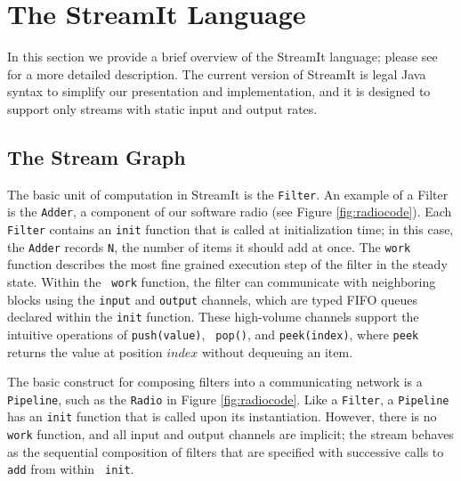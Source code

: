 \documentclass{sig-alternate}
\begin{document}
\section{The StreamIt Language}

In this section we provide a brief overview of the StreamIt language;
please see \cite{streamittech} for a more detailed description.  The
current version of StreamIt is legal Java syntax to simplify our
presentation and implementation, and it is designed to support only
streams with static input and output rates.

\subsection{The Stream Graph}

The basic unit of computation in StreamIt is the {\tt Filter}.  An
example of a Filter is the {\tt Adder}, a component of our software
radio (see Figure \ref{fig:radiocode}).  Each {\tt Filter} contains an
{\tt init} function that is called at initialization time; in this
case, the {\tt Adder} records {\tt N}, the number of items it should
add at once.  The {\tt work} function describes the most fine grained
execution step of the filter in the steady state.  Within the {\tt
work} function, the filter can communicate with neighboring blocks
using the {\tt input} and {\tt output} channels, which are typed FIFO
queues declared within the {\tt init} function.  These high-volume
channels support the intuitive operations of {\tt push(value)}, {\tt
pop()}, and {\tt peek(index)}, where {\tt peek} returns the value at
position $index$ without dequeuing an item.

The basic construct for composing filters into a communicating network
is a {\tt Pipeline}, such as the {\tt Radio} in Figure
\ref{fig:radiocode}.  Like a {\tt Filter}, a {\tt Pipeline} has an
{\tt init} function that is called upon its instantiation.  However,
there is no {\tt work} function, and all input and output channels are
implicit; the stream behaves as the sequential composition of filters
that are specified with successive calls to {\tt add} from within {\tt
init}.
\end{document}
